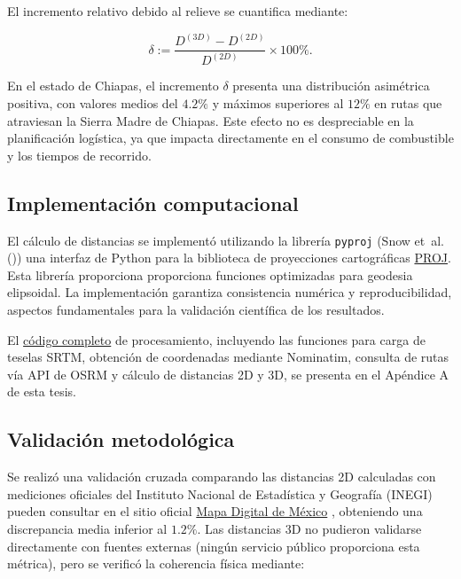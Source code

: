 \documentclass[
  spanish,
  us-letterpaper,
]{scrreprt}
\numberwithin{equation}{section}
\begin{document}
El incremento relativo debido al relieve se cuantifica mediante:

\[
\delta := \frac{D^{(3D)} - D^{(2D)}}{D^{(2D)}} \times 100\%.
\]

En el estado de Chiapas, el incremento \(\delta\) presenta una
distribución asimétrica positiva, con valores medios del \(4.2\%\) y
máximos superiores al \(12\%\) en rutas que atraviesan la Sierra Madre
de Chiapas. Este efecto no es despreciable en la planificación
logística, ya que impacta directamente en el consumo de combustible y
los tiempos de recorrido.

\subsection{Implementación
computacional}\label{implementaciuxf3n-computacional-1}

El cálculo de distancias se implementó utilizando la librería
\texttt{pyproj} (Snow et~al. ()) una
interfaz de Python para la biblioteca de proyecciones cartográficas
\href{https://pyproj4.github.io/pyproj/stable/}{PROJ}. Esta librería
proporciona proporciona funciones optimizadas para geodesia elipsoidal.
La implementación garantiza consistencia numérica y reproducibilidad,
aspectos fundamentales para la validación científica de los resultados.

El
\href{https://github.com/AngelaOrtiz25/tesis_angela/blob/gh-pages/datos_codigos/recolecion_de_datos_pagerank.ipynb}{código
completo} de procesamiento, incluyendo las funciones para carga de
teselas SRTM, obtención de coordenadas mediante Nominatim, consulta de
rutas vía API de OSRM y cálculo de distancias 2D y 3D, se presenta en el
Apéndice A de esta tesis.

\subsection{Validación
metodológica}\label{validaciuxf3n-metodoluxf3gica}

Se realizó una validación cruzada comparando las distancias 2D
calculadas con mediciones oficiales del Instituto Nacional de
Estadística y Geografía (INEGI) pueden consultar en el sitio oficial
\href{https://gaia.inegi.org.mx/mdm6/}{Mapa Digital de México} ,
obteniendo una discrepancia media inferior al \(1.2\%\). Las distancias
3D no pudieron validarse directamente con fuentes externas (ningún
servicio público proporciona esta métrica), pero se verificó la
coherencia física mediante:
\end{document}
